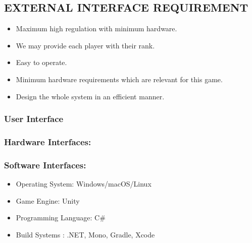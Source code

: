 \documentclass[12pt]{report}
\begin{document}
\subsection{ EXTERNAL INTERFACE REQUIREMENT}

\justifying
\setlength{\parindent}{4em}
\setlength{\parskip}{0.5em}
\renewcommand{\baselinestretch}{1.5}
\normalsize\begin{itemize}\item  Maximum high regulation with minimum hardware.
\item We may provide each player with their rank.
\item Easy to operate.
\item Minimum hardware requirements which are relevant for this game.
\item Design the whole system in an efficient manner.
\end{itemize}
\subsubsection{ User Interface}
\subsubsection{ Hardware Interfaces:}
\normalsize



\subsubsection{ Software Interfaces:}
\normalsize
\begin{itemize}
\item Operating System: Windows/macOS/Linux 

\item Game Engine: Unity 

\item Programming Language: C\#

\item Build Systems : .NET, Mono, Gradle, Xcode

\end{itemize}
\end{document}
